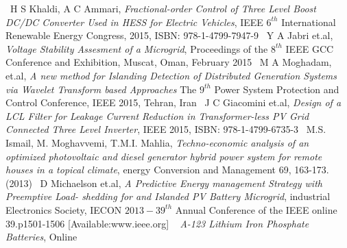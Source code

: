 \documentclass[journal,twoside]{IEEEtran}
\begin{document}
\begin{thebibliography}{99}
        ~H S Khaldi, A C Ammari, \emph{Fractional-order
        Control of Three Level Boost DC/DC Converter
        Used in HESS for Electric Vehicles}, IEEE $6^{th}$
        International Renewable Energy Congress, 2015,
        ISBN: 978-1-4799-7947-9
        ~Y A Jabri et.al, \emph{Voltage Stability Assesment of a
        Microgrid}, Proceedings of the $8^{th}$ IEEE GCC Conference and Exhibition, Muscat, Oman,
        February 2015
        ~M A Moghadam, et.al, \emph{ A new method for
        Islanding Detection of Distributed Generation
        Systems via Wavelet Transform based Approaches}
        The $9^{th}$ Power System Protection and Control
        Conference, IEEE 2015, Tehran, Iran
        ~J C Giacomini et.al, \emph{Design of a LCL Filter for
        Leakage Current Reduction in Transformer-less
        PV Grid Connected Three Level Inverter}, IEEE
        2015, ISBN: 978-1-4799-6735-3
        ~M.S. Ismail, M. Moghavvemi, T.M.I. Mahlia,
        \emph{Techno-economic analysis of an optimized
        photovoltaic and diesel generator hybrid power
        system for remote houses in a topical climate},
        energy Conversion and Management 69, 163-173.
        (2013)
        ~D Michaelson et.al, \emph{A Predictive Energy
        management Strategy with Preemptive Load-
        shedding for and Islanded PV Battery Microgrid},
        industrial Electronics Society, IECON $2013-39^{th}$
        Annual Conference of the IEEE \lbrack online\rbrack
        39.p1501-1506 [Available:www.ieee.org]
        ~\emph{ A-123 Lithium Iron Phosphate Batteries}, \lbrack Online




\end{thebibliography}
\end{document}
